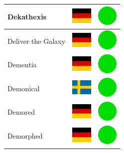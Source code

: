 \documentclass[12pt, a4paper, twoside]{report}
\begin{document}
\begin{center}
\begin{longtable}{|p{5cm}|p{2cm}|p{2cm}|}
 Dekathexis                                                 & \includegraphics[width=1cm]{../img/flags/de} &   \includegraphics[width=1cm]{../likes/y} \\ \hline
 Deliver the Galaxy                                         & \includegraphics[width=1cm]{../img/flags/de} &   \includegraphics[width=1cm]{../likes/y} \\ \hline
 Dementia                                                   & \includegraphics[width=1cm]{../img/flags/de} &   \includegraphics[width=1cm]{../likes/y} \\ \hline
 Demonical                                                  & \includegraphics[width=1cm]{../img/flags/se} &   \includegraphics[width=1cm]{../likes/y} \\ \hline
 Demored                                                    & \includegraphics[width=1cm]{../img/flags/de} &   \includegraphics[width=1cm]{../likes/y} \\ \hline
 Demorphed                                                  & \includegraphics[width=1cm]{../img/flags/de} &   \includegraphics[width=1cm]{../likes/y} \\ \hline

\end{longtable}
\end{center}
\end{document}
